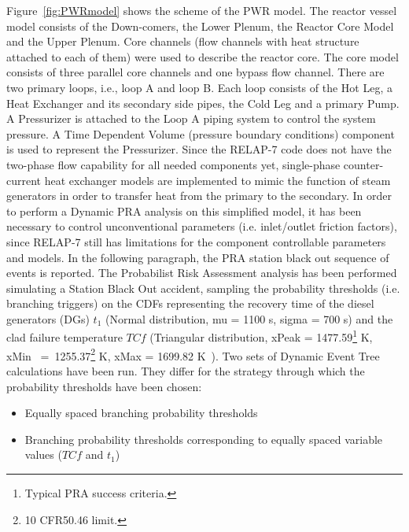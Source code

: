 \documentclass{mc2013}
\begin{document}
Figure~\ref{fig:PWRmodel} shows the scheme of the PWR model. The reactor vessel model consists of the Down-comers, the Lower Plenum, the Reactor Core Model and the Upper Plenum. Core channels (flow channels with heat structure attached to each of them) were used to describe the reactor core. The core model consists of three parallel core channels and one bypass flow channel. 
There are two primary loops, i.e., loop A and loop B. Each loop consists of the Hot Leg, a Heat Exchanger and its secondary side pipes, the Cold Leg and a primary Pump. A Pressurizer is attached to the Loop A piping system to control the system pressure. A Time Dependent Volume (pressure boundary conditions) component is used to represent the Pressurizer. Since the RELAP-7 code does not have the two-phase flow capability for all needed components yet, single-phase counter-current heat exchanger models are implemented to mimic the function of steam generators in order to transfer heat from the primary to the secondary.
In order to perform a Dynamic PRA analysis on this simplified model, it has been necessary to control unconventional parameters (i.e. inlet/outlet friction factors), since RELAP-7 still has limitations for the component controllable parameters and models. In the following paragraph, the PRA station black out sequence of events is reported. 
The Probabilist Risk Assessment analysis has been performed simulating a Station Black Out accident, sampling the probability thresholds (i.e. branching triggers) on the CDFs representing  the recovery time of the diesel generators (DGs)  $t_{1}$ (Normal distribution, mu = 1100 s, sigma = 700 s)  and the clad failure temperature $TC{f}$  (Triangular distribution, xPeak = 1477.59\footnote{Typical PRA success criteria.} K, xMin~ =~1255.37\footnote{10 CFR50.46 limit.} K, xMax = 1699.82 K~\cite{Urbanic1978}). Two sets of Dynamic Event Tree calculations have been run. They differ for the strategy through which the probability thresholds have been chosen:
\vspace{-5mm}
\begin{itemize}
    \item Equally spaced branching probability thresholds
    \item Branching probability thresholds corresponding to equally spaced variable values ($TC{f}$ and $t_{1}$)
\end{itemize}
\end{document}
